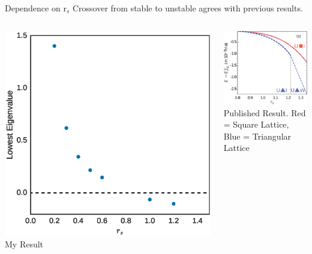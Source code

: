 \documentclass[10pt]{beamer}
\begin{document}
{{{{{{{{{{{{{{%
\begin{frame}{Dependence on r${}_s$}
	Crossover from stable to unstable agrees with previous results.
	\begin{columns}[c] %
		\begin{column}{.5\textwidth}
			\includegraphics[width=0.95\linewidth]{../images/stab_rs.eps}
			\\
			My Result
		\end{column}
		\hfill
		\begin{column}{0.5\textwidth}
			\includegraphics[width=.95\linewidth]{../images/Bernu_2dEnergyGain.pdf}
			\\
			Published Result. Red = Square Lattice, Blue = Triangular Lattice
		\end{column}	
	\end{columns}
\end{frame}



}}}}}}}}}}}}}}
\end{document}
